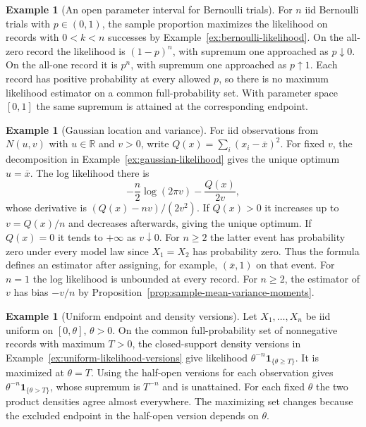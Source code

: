 \documentclass[11pt,oneside]{book}
\theoremstyle{definition}
\newtheorem{example}[theorem]{Example}
\theoremstyle{remark}
\newcommand{\R}{\mathbb R}
\begin{document}
\begin{example}[An open parameter interval for Bernoulli trials]
\label{ex:ml-open-bernoulli}
For $n$ iid Bernoulli trials with $p\in(0,1)$, the sample
proportion maximizes the likelihood on records with $0<k<n$
successes by Example~\ref{ex:bernoulli-likelihood}. On the all-zero
record the likelihood is $(1-p)^n$, with supremum one approached
as $p\downarrow0$. On the all-one record it is $p^n$, with supremum
one approached as $p\uparrow1$. Each record has positive probability
at every allowed $p$, so there is no maximum likelihood estimator
on a common full-probability set. With parameter space $[0,1]$
the same supremum is attained at the corresponding endpoint.
\end{example}

\begin{example}[Gaussian location and variance]
\label{ex:ml-normal-location-variance}
For iid observations from $N(u,v)$ with $u\in\R$ and $v>0$, write
$Q(x)=\sum_i(x_i-\overline x)^2$. For fixed $v$, the decomposition in
Example~\ref{ex:gaussian-likelihood} gives the unique optimum
$u=\overline x$. The log likelihood there is
\[
-\frac n2\log(2\pi v)-\frac{Q(x)}{2v},
\]
whose derivative is $(Q(x)-nv)/(2v^2)$. If $Q(x)>0$ it increases
up to $v=Q(x)/n$ and decreases afterwards, giving the unique optimum.
If $Q(x)=0$ it tends to $+\infty$ as $v\downarrow0$.
For $n\geq2$ the latter event has probability zero under every model
law since $X_1=X_2$ has probability zero. Thus the formula defines
an estimator after assigning, for example, $(\overline x,1)$ on that
event. For $n=1$ the log likelihood is unbounded at every record.
For $n\geq2$, the estimator of $v$ has bias $-v/n$ by
Proposition~\ref{prop:sample-mean-variance-moments}.
\end{example}

\begin{example}[Uniform endpoint and density versions]
\label{ex:ml-sample-uniform-versions}
Let $X_1,\ldots,X_n$ be iid uniform on $[0,\theta]$, $\theta>0$.
On the common full-probability set of nonnegative records with
maximum $T>0$, the closed-support density versions in
Example~\ref{ex:uniform-likelihood-versions} give likelihood
$\theta^{-n}\mathbf 1_{\{\theta\geq T\}}$. It is maximized at
$\theta=T$. Using the half-open versions for each observation
gives $\theta^{-n}\mathbf 1_{\{\theta>T\}}$, whose supremum is
$T^{-n}$ and is unattained. For each fixed $\theta$ the two
product densities agree almost everywhere. The maximizing
set changes because the excluded endpoint in the half-open
version depends on $\theta$.
\end{example}
\end{document}
